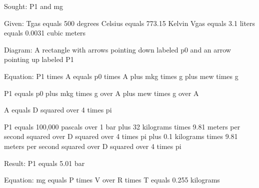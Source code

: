 Sought: P1 and mg  

Given: Tgas equals 500 degrees Celsius equals 773.15 Kelvin  
Vgas equals 3.1 liters equals 0.0031 cubic meters  

Diagram: A rectangle with arrows pointing down labeled p0 and an arrow pointing up labeled P1  

Equation:  
P1 times A equals p0 times A plus mkg times g plus mew times g  

P1 equals p0 plus mkg times g over A plus mew times g over A  

A equals D squared over 4 times pi  

P1 equals 100,000 pascals over 1 bar plus 32 kilograms times 9.81 meters per second squared over D squared over 4 times pi plus 0.1 kilograms times 9.81 meters per second squared over D squared over 4 times pi  

Result: P1 equals 5.01 bar  

Equation: mg equals P times V over R times T equals 0.255 kilograms